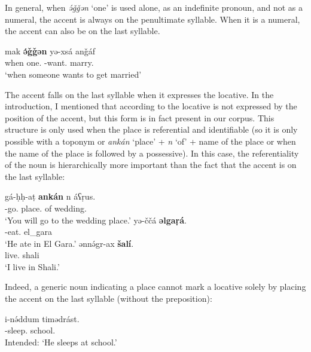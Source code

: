 \documentclass[output=paper]{langsci/langscibook}
\begin{document}
In general, when {\emph{ə́ǧǧən}} `one' is used alone, as an indefinite pronoun, and not as a numeral, the accent is always on the penultimate syllable. When it is a numeral, the accent can also be on the last syllable.

\begin{exe}
\ex\label{5ex:36}
\gll	mak	{\bf{ə́ǧǧən}}	yə-xsá	anǧáf \\
	when	one.{}	{}-want.{}	marry.{} \\
\glt	`when someone wants to get married'
\end{exe}


The accent falls on the last syllable when it expresses the locative. In the introduction, I mentioned that according to \cite{louali:03} the locative is not expressed by the position of the accent, but this form is in fact present in our corpus. This structure is only used when the place is referential and identifiable (so it is only possible with a toponym or {\emph{ankán}} `place' + {\emph{n}} `of' + name of the place or when the name of the place is followed by a possessive). In this case, the referentiality of the noun is hierarchically more important than the fact that the accent is on the last syllable:


\begin{exe}
\ex\label{5ex:37}
\gll	gá-ḥḥ-aṭ	{\bf{ankán}}	n	áʕṛus. \\
	{}-go.{}	place.{}	of	wedding.{} \\
\glt	`You will go to the wedding place.' 
\ex\label{5ex:38}
\gll	yə-ččá	{\bf{əlgaṛá}}. \\
	{}-eat.{}	el\_gara \\
\glt	`He ate in El Gara.'
\ex\label{5ex:39}
\gll	ənnə́gr-ax		{\bf{šalí}}. \\
	live.{}	shali \\
\glt	`I live in Shali.'
\end{exe}

Indeed, a generic noun indicating a place cannot mark a locative solely by placing the accent on the last syllable (without the preposition):

\begin{exe}
\ex\label{5ex:40}
\gll	*i-nə́ddum		timədrást. \\
	{}-sleep.{}	school.{} \\
\glt	Intended: `He sleeps at school.'
\end{exe}
\end{document}
